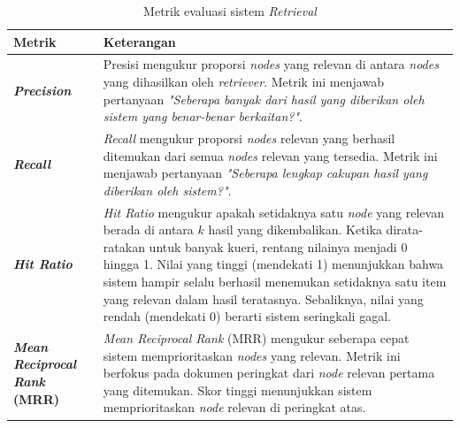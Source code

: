 \begin{table}[H]
	\centering
	\caption{Metrik evaluasi sistem \textit{Retrieval} }
	\label{tab:retrieval-evaluation-metrics}
	\begin{tabular}{|p{}|p{}|}
		\hline
		\textbf{Metrik}                              & \textbf{Keterangan}                                                                                                                                                                                                                                    \\
		\hline
		\textbf{\textit{Precision}}                  &
		Presisi mengukur proporsi \textit{nodes} yang relevan di antara \textit{nodes} yang dihasilkan oleh \textit{retriever}. Metrik ini menjawab pertanyaan \textit{"Seberapa banyak dari hasil yang diberikan oleh sistem yang benar-benar berkaitan?"}.                                                  \\
		\hline
		\textbf{\textit{Recall}}                     &
		\textit{Recall} mengukur proporsi \textit{nodes} relevan yang berhasil ditemukan dari semua \textit{nodes} relevan yang tersedia. Metrik ini menjawab pertanyaan \textit{"Seberapa lengkap cakupan hasil yang diberikan oleh sistem?"}.                                                               \\
		\hline
		\textbf{\textit{Hit Ratio}}                  &
		\textit{Hit Ratio} mengukur apakah setidaknya satu \textit{node} yang relevan berada di antara $k$ hasil yang dikembalikan.
		Ketika dirata-ratakan untuk banyak kueri, rentang nilainya menjadi 0 hingga 1.
		Nilai yang tinggi (mendekati 1) menunjukkan bahwa sistem hampir selalu berhasil menemukan setidaknya satu item yang relevan dalam hasil teratasnya.
		Sebaliknya, nilai yang rendah (mendekati 0) berarti sistem seringkali gagal.                                                                                                                                                                                                                          \\
		\hline
		\textbf{\textit{Mean Reciprocal Rank} (MRR)} &
		\textit{Mean Reciprocal Rank} (MRR) mengukur seberapa cepat sistem memprioritaskan \textit{nodes} yang relevan. Metrik ini berfokus pada dokumen peringkat dari \textit{node} relevan pertama yang ditemukan. Skor tinggi menunjukkan sistem memprioritaskan \textit{node} relevan di peringkat atas. \\
		\hline
	\end{tabular}
\end{table}

